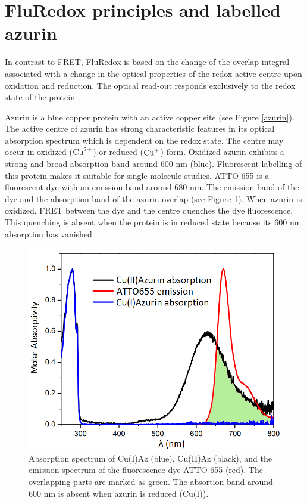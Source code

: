 \documentclass[twoside,single]{lion-msc}
\begin{document}
\section{FluRedox principles and labelled azurin}
In contrast to FRET, FluRedox is based on the change of the overlap integral associated with a change in the optical properties of the redox-active centre upon oxidation and reduction. The optical read-out responds exclusively to the redox state of the protein \cite{Akklc}. 

Azurin is a blue copper protein with an active copper site (see Figure \ref{azurin}). The active centre of azurin has strong characteristic features in its optical absorption spectrum which is dependent on the redox state. The centre may occur in oxidized ($\textup{Cu}^{2+}$) or reduced ($\textup{Cu}^{+}$) form. Oxidized azurin exhibits a strong and broad absorption band around 600 nm (blue). Fluorescent labelling of this protein makes it suitable for single-molecule studies. ATTO 655 is a fluorescent dye with an emission band around 680 nm. The emission band of the dye and the absorption band of the azurin overlap (see Figure \ref{absorption}). When azurin is oxidized, FRET between the dye and the centre quenches the dye fluorescence. This quenching is absent when the protein is in reduced state because its 600 nm absorption has vanished \cite{Tabares2014}.
\begin{figure}[ht!]
\centering
\includegraphics[width=\textwidth]{absorp.png}
\caption{Absorption spectrum of Cu(I)Az (blue), Cu(II)Az (black), and the emission spectrum of the fluorescence dye ATTO 655 (red). The overlapping parts are marked as green. The absortion band around 600 nm is absent when azurin is reduced (Cu(I)).} 
\label{absorption}
\end{figure}
\end{document}
